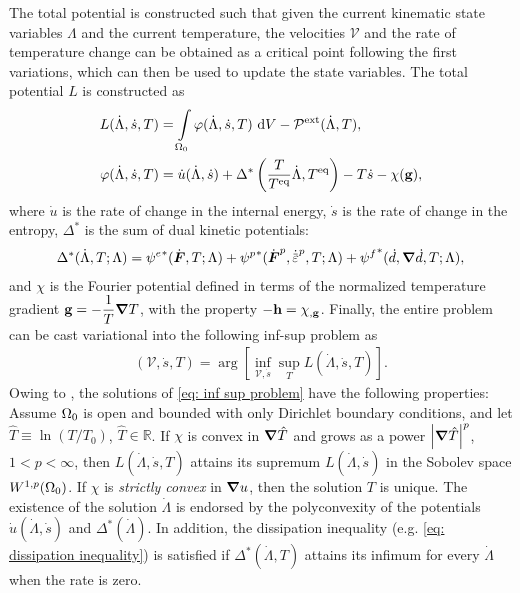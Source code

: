 The total potential is constructed such that given the current kinematic state variables $\Lambda$ and the current temperature, the velocities $\mathcal{V}$ and the rate of temperature change can be obtained as a critical point following the first variations, which can then be used to update the state variables. The total potential $L$ is constructed as
\begin{subequations}
\begin{align}
  L(\dot{\Lambda}, \dot{s}, T) &= \int\limits_{\Omega_0} \varphi(\dot{\Lambda}, \dot{s}, T) \text{ d}V - \mathcal{P}^\text{ext}(\dot{\Lambda}, T), \label{eq: total potential 1}\\
  \varphi(\dot{\Lambda}, \dot{s}, T) &= \dot{u}(\dot{\Lambda}, \dot{s}) + \Delta^*\left( \dfrac{T}{T^\text{eq}}\dot{\Lambda}, T^\text{eq} \right) - T\dot{s} - \chi(\textbf{g}), \label{eq: local energy density}
\end{align}
\end{subequations}
where $\dot{u}$ is the rate of change in the internal energy, $\dot{s}$ is the rate of change in the entropy, $\Delta^*$ is the sum of dual kinetic potentials:
\begin{align}
    \Delta^*(\dot{\Lambda}, T; \Lambda) = {\psi^e}^*(\dot{\defgrad}, T; \Lambda) + {\psi^p}^*(\dot{\defgrad}^p, \epdot, T; \Lambda) + {\psi^f}^*(\dot{d}, \grad \dot{d}, T; \Lambda), \label{eq: dual kinetic potentials}
\end{align}
and $\chi$ is the Fourier potential defined in terms of  the normalized temperature gradient $\textbf{g} = -\dfrac{1}{T}\boldsymbol{\nabla} T$, with the property $-\textbf{h} = \chi_{,\textbf{g}}$.
Finally, the entire problem can be cast variational into the following inf-sup problem as
\begin{align}
     \left( \mathcal{V}, \dot{s}, T \right) = \arg \left[ \inf_{\mathcal{V}, \dot{s}} \sup_T L(\dot{\Lambda}, \dot{s}, T) \right]. \label{eq: inf sup problem}
\end{align}
Owing to \cite{dal2012introduction,yang2006variational}, the solutions of \eqref{eq: inf sup problem} have the following properties: Assume $\Omega_0$ is open and bounded with only Dirichlet boundary conditions, and let $\hat{T} \equiv \ln(T/T_0)$, $\hat{T} \in \mathbb{R}$. If $\chi$ is convex in $\boldsymbol{\nabla} \hat{T}$ and grows as a power $\left\vert{\boldsymbol{\nabla}\hat{T}}\right\vert^p$, $1 < p < \infty$, then $L(\dot{\Lambda}, \dot{s}, T)$ attains its supremum $L(\dot{\Lambda}, \dot{s})$ in the Sobolev space $W^{1,p}(\Omega_0)$. If $\chi$ is \emph{strictly convex} in $\boldsymbol{\nabla} u$, then the solution $T$ is unique. The existence of the solution $\dot{\Lambda}$ is endorsed by the polyconvexity of the potentials $\dot{u}(\dot{\Lambda}, \dot{s})$ and $\Delta^*(\dot{\Lambda})$. In addition, the dissipation inequality (e.g. \eqref{eq: dissipation inequality}) is satisfied if $\Delta^*(\dot{\Lambda}, T)$ attains its infimum for every $\dot{\Lambda}$ when the rate is zero.

